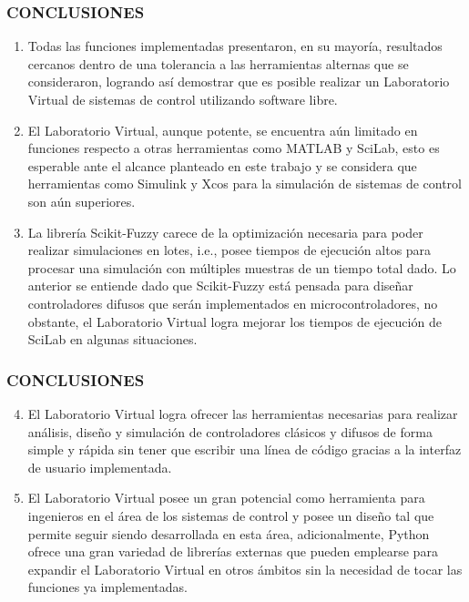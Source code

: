 \documentclass[usenames,xcolor={dvipsnames, table}]{beamer}
\begin{document}
\begin{frame}
	\frametitle{CONCLUSIONES}
	\small
	\vspace{20pt}
	\begin{enumerate}
        \item Todas las funciones implementadas presentaron, en su mayoría, resultados cercanos dentro de una tolerancia a las herramientas alternas que se consideraron, logrando así demostrar que es posible realizar un Laboratorio Virtual de sistemas de control utilizando software libre.
        
        \item El Laboratorio Virtual, aunque potente, se encuentra aún limitado en funciones respecto a otras herramientas como MATLAB y SciLab, esto es esperable ante el alcance planteado en este trabajo y se considera que herramientas como Simulink y Xcos para la simulación de sistemas de control son aún superiores.
		
		\item La librería Scikit-Fuzzy carece de la optimización necesaria para poder realizar simulaciones en lotes, i.e., posee tiempos de ejecución altos para procesar una simulación con múltiples muestras de un tiempo total dado. Lo anterior se entiende dado que Scikit-Fuzzy está pensada para diseñar controladores difusos que serán implementados en microcontroladores, no obstante, el Laboratorio Virtual logra mejorar los tiempos de ejecución de SciLab en algunas situaciones.
    \end{enumerate}

\end{frame}

\begin{frame}
	\frametitle{CONCLUSIONES}
	\small
	\vspace{15pt}
	\begin{enumerate}
		\setcounter{enumi}{3}
		\setlength\itemsep{1em}      
        \item El Laboratorio Virtual logra ofrecer las herramientas necesarias para realizar análisis, diseño y simulación de controladores clásicos y difusos de forma simple y rápida sin tener que escribir una línea de código gracias a la interfaz de usuario implementada.
        
        \item El Laboratorio Virtual posee un gran potencial como herramienta para ingenieros en el área de los sistemas de control y posee un diseño tal que permite seguir siendo desarrollada en esta área, adicionalmente, Python ofrece una gran variedad de librerías externas que pueden emplearse para expandir el Laboratorio Virtual en otros ámbitos sin la necesidad de tocar las funciones ya implementadas.
    \end{enumerate}

\end{frame}
\end{document}
